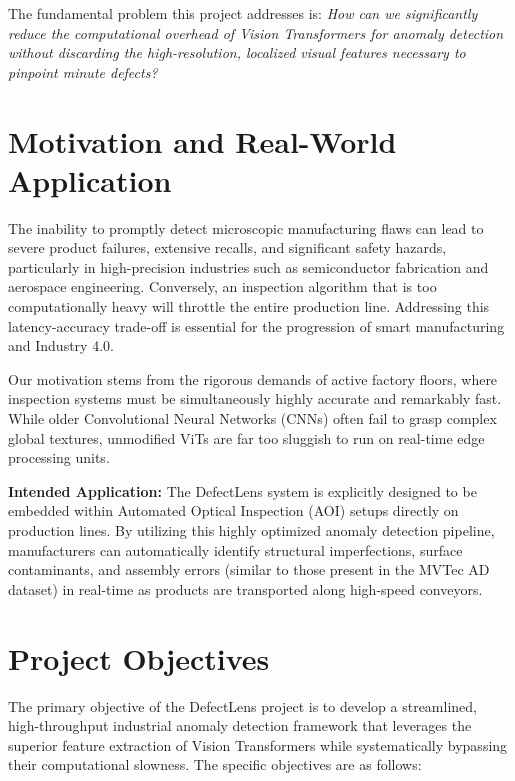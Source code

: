 \documentclass[12pt]{article}
\begin{document}
The fundamental problem this project addresses is: \textit{How can we significantly reduce the computational overhead of Vision Transformers for anomaly detection without discarding the high-resolution, localized visual features necessary to pinpoint minute defects?}

\section{Motivation and Real-World Application}
The inability to promptly detect microscopic manufacturing flaws can lead to severe product failures, extensive recalls, and significant safety hazards, particularly in high-precision industries such as semiconductor fabrication and aerospace engineering. Conversely, an inspection algorithm that is too computationally heavy will throttle the entire production line. Addressing this latency-accuracy trade-off is essential for the progression of smart manufacturing and Industry 4.0.

Our motivation stems from the rigorous demands of active factory floors, where inspection systems must be simultaneously highly accurate and remarkably fast. While older Convolutional Neural Networks (CNNs) often fail to grasp complex global textures, unmodified ViTs are far too sluggish to run on real-time edge processing units.

\textbf{Intended Application:} The DefectLens system is explicitly designed to be embedded within Automated Optical Inspection (AOI) setups directly on production lines. By utilizing this highly optimized anomaly detection pipeline, manufacturers can automatically identify structural imperfections, surface contaminants, and assembly errors (similar to those present in the MVTec AD dataset) in real-time as products are transported along high-speed conveyors.

\section{Project Objectives}
The primary objective of the DefectLens project is to develop a streamlined, high-throughput industrial anomaly detection framework that leverages the superior feature extraction of Vision Transformers while systematically bypassing their computational slowness. The specific objectives are as follows:
\end{document}
